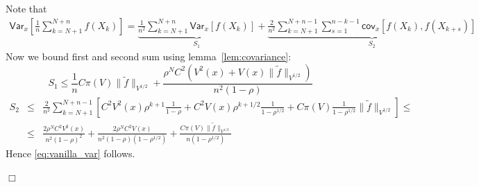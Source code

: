 \documentclass[bj]{imsart}
\def\PVar{\mathsf{Var}}
\def\PCov{\mathsf{cov}}
\newcommand{\proofendsign}{$\Box$}
\newenvironment{proof}{{\noindent \bf Proof }}
 {{\hspace*{\fill}\proofendsign\par\bigskip}}
\begin{document}
\begin{proof}
Note that 
\begin{eqnarray*}
\PVar_x \left[ \frac{1}{n}\sum\limits_{k=N+1}^{N+n}f(X_k) \right] = \underbrace{\frac{1}{n^2}\sum\limits_{k=N+1}^{N+n}\PVar_x \left[ f(X_k) \right]}_{S_1} + \underbrace{\frac{2}{n^2}\sum\limits_{k=N+1}^{N+n-1}\sum\limits_{s=1}^{n-k-1}\PCov_x\left[f(X_k),f(X_{k+s})\right]}_{S_2}
\end{eqnarray*}
Now we bound first and second sum using lemma~\ref{lem:covariance}:
\[
S_1 \leq \frac{1}{n}C\pi(V)\|\tilde{f}\|_{V^{1/2}} + \frac{\rho^N C^2\left(V^2(x) + V(x)\|\tilde{f}\|_{V^{1/2}}\right)}{n^2(1-\rho)}
\]
\begin{eqnarray*}
S_2 & \leq & \frac{2}{n^2}\sum\limits_{k=N+1}^{N+n-1}\left[C^2V^2(x)\rho^{k+1}\frac{1}{1-\rho} + C^2V(x)\rho^{k+1/2}\frac{1}{1-\rho^{1/2}} + C\pi(V)\frac{1}{1-\rho^{1/2}}\|\tilde{f}\|_{V^{1/2}}\right] \leq \\
& \leq & \frac{2\rho^NC^2V^2(x)}{n^2(1-\rho)^2} + \frac{2\rho^NC^2V(x)}{n^2(1-\rho)(1-\rho^{1/2})} + \frac{C\pi(V)\|\tilde{f}\|_{V^{1/2}}}{n(1-\rho^{1/2})}
\end{eqnarray*}
Hence \eqref{eq:vanilla_var} follows.
\end{proof} 
\end{document}
